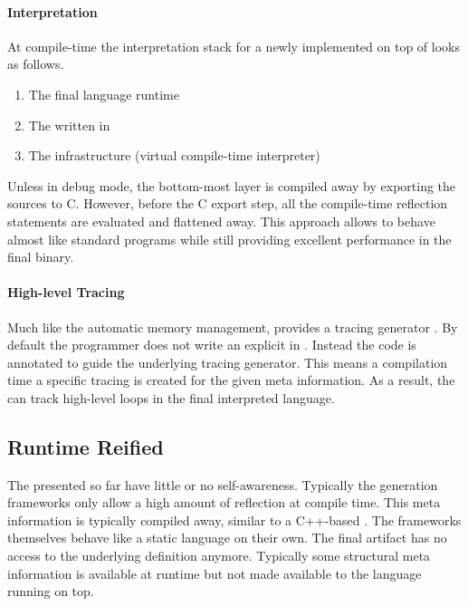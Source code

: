 \paragraph{\RPython Interpretation}
At compile-time the interpretation stack for a newly implemented \VM on top of \PyPy looks as follows.
%
\begin{enumerate}
\item The final language runtime
\item The \VM written in \RPython
\item The \PyPy infrastructure (virtual compile-time \RPython interpreter)
\end{enumerate}
%
Unless in debug mode, the bottom-most layer is compiled away by exporting the \RPython sources to C.
However, before the C export step, all the compile-time reflection statements are evaluated and flattened away.
This approach allows \RPython \VMs to behave almost like standard \Python programs while still providing excellent performance in the final \VM binary.

\paragraph{High-level Tracing \JIT}
Much like the automatic memory management, \PyPy provides a tracing \JIT generator \cite{Bolz09a}.
By default the \VM programmer does not write an explicit \JIT in \PyPy.
Instead the \VM code is annotated to guide the underlying tracing \JIT generator.
This means a \VM compilation time a specific tracing \JIT is created for the given meta information.
As a result, the \JIT can track high-level loops in the final interpreted language.


\subsection{Runtime Reified \VMs}

The \VMs presented so far have little or no self-awareness.
Typically the \VM generation frameworks only allow a high amount of reflection at \VM compile time.
This meta information is typically compiled away, similar to a C++-based \VM.
The \VM frameworks themselves behave like a static language on their own.
The final \VM artifact has no access to the underlying definition anymore.
Typically some structural meta information is available at runtime but not made available to the language running on top.


